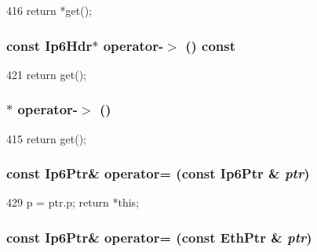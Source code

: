 \begin{DoxyCode}
416 { return *get(); }
\end{DoxyCode}
\hypertarget{classNet_1_1Ip6Ptr_a04bea2f4087ca47c04affe3e878001c6}{
\subsubsection[{operator-\/$>$}]{\setlength{\rightskip}{0pt plus 5cm}const {\bf Ip6Hdr}$\ast$ operator-\/$>$ () const}}
\label{classNet_1_1Ip6Ptr_a04bea2f4087ca47c04affe3e878001c6}



\begin{DoxyCode}
421 { return get(); }
\end{DoxyCode}
\hypertarget{classNet_1_1Ip6Ptr_afbc698b88972ac0ed87189431ed2405d}{
\subsubsection[{operator-\/$>$}]{$\ast$ operator-\/$>$ ()}}
\label{classNet_1_1Ip6Ptr_afbc698b88972ac0ed87189431ed2405d}



\begin{DoxyCode}
415 { return get(); }
\end{DoxyCode}
\hypertarget{classNet_1_1Ip6Ptr_a4f80dfc3261fbb886b014d16e991360d}{
\subsubsection[{operator=}]{\setlength{\rightskip}{0pt plus 5cm}const {\bf Ip6Ptr}\& operator= (const {\bf Ip6Ptr} \& {\em ptr})}}
\label{classNet_1_1Ip6Ptr_a4f80dfc3261fbb886b014d16e991360d}



\begin{DoxyCode}
429     { p = ptr.p; return *this; }
\end{DoxyCode}
\hypertarget{classNet_1_1Ip6Ptr_a3e72174b84b4802f753e4c42b0c207b5}{
\subsubsection[{operator=}]{\setlength{\rightskip}{0pt plus 5cm}const {\bf Ip6Ptr}\& operator= (const {\bf EthPtr} \& {\em ptr})}}
\label{classNet_1_1Ip6Ptr_a3e72174b84b4802f753e4c42b0c207b5}



